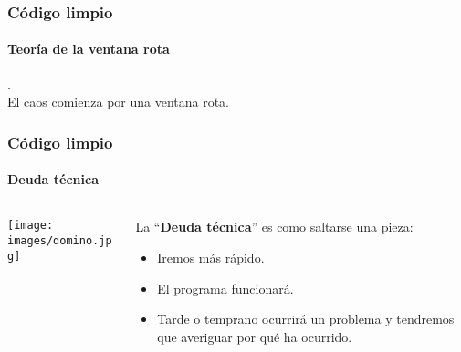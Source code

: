   {

  \begin{frame}
   \frametitle{Código limpio}
   \framesubtitle{Teoría de la ventana rota}
   .%
   \\[6pc]
   El caos comienza por una ventana rota.

  \end{frame}
  }

  {
   \usebackgroundtemplate{}

  \begin{frame}
   \frametitle{Código limpio}
   \framesubtitle{Deuda técnica}

   \begin{columns}
    \begin{column}{4cm}
     \texttt{[image: images/domino.jpg]}
     \end{column}
    \begin{column}{7cm}
     La ``\textbf{Deuda técnica}'' es como saltarse una pieza:
     \begin{itemize}
      \item Iremos más rápido.
      \item El programa funcionará.
      \item Tarde o temprano ocurrirá un problema y tendremos que
	    averiguar por qué ha ocurrido.
     \end{itemize}
    \end{column}
   \end{columns}
  \end{frame}
  }
